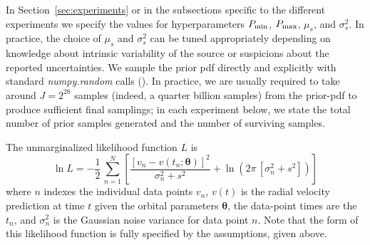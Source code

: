 \documentclass[manuscript, letterpaper]{aastex6}
\newcommand{\project}[1]{\textsl{#1}}
\newcommand{\sectionname}{Section}
\newcommand{\bs}[1]{\boldsymbol{#1}}
\begin{document}
In \sectionname~\ref{sec:experiments} or in the subsections specific to the
different experiments we specify the values for hyperparameters $P_{\rm min}$,
$P_{\rm max}$, $\mu_s$, and $\sigma^2_s$.
In practice, the choice of $\mu_s$ and $\sigma^2_s$ can be tuned appropriately
depending on knowledge about intrinsic variability of the source or suspicions
about the reported uncertainties.
We sample the prior pdf directly and explicitly with standard
\project{numpy.random} calls (\citealt{Van-der-Walt:2011}).
In practice, we are usually required to take around $J=2^{28}$ samples (indeed,
a quarter billion samples) from the prior-pdf to produce sufficient final
samplings; in each experiment below, we state  the total number of prior samples
generated and the number of surviving samples.

The unmarginalized likelihood function $L$ is
\begin{equation}
\ln L = -\frac{1}{2}\,\sum_{n=1}^N \left[\frac{[v_n - v(t_n;\bs{\theta})]^2}{\sigma_n^2 + s^2}
 +\ln \left(2\pi\,[\sigma_n^2 + s^2]\right) \right]
\end{equation}
where $n$ indexes the individual data points $v_n$, $v(t)$ is the radial
velocity prediction at time $t$ given the orbital parameters $\bs{\theta}$, the
data-point times are the $t_n$, and $\sigma_n^2$ is the Gaussian noise variance
for data point $n$.
Note that the form of this likelihood function is fully specified by the
assumptions, given above.
\end{document}
